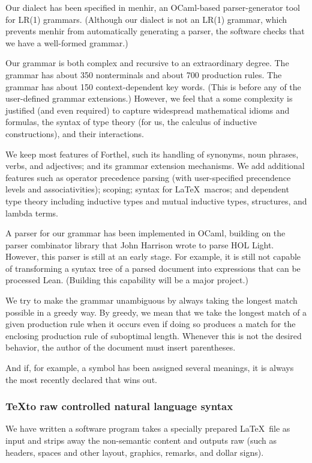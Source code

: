 \documentclass[12pt]{amsart}
\renewcommand{\~}{\ }
\renewcommand{\_}{\textunderscore}
\begin{document}
Our dialect has been specified in menhir, an OCaml-based
parser-generator tool for LR(1) grammars.  (Although our dialect is
not an LR(1) grammar, which prevents menhir from automatically
generating a parser, the software checks that we have a well-formed
grammar.)

Our grammar is both complex and recursive to an extraordinary degree.
The grammar has about 350 nonterminals and about 700 production
rules.  The grammar has about 150 context-dependent key words.  (This
is before any of the user-defined grammar extensions.)  However, we
feel that a some complexity is justified (and even required) to
capture widespread mathematical idioms and formulas, the syntax of type
theory (for us, the calculus of inductive constructions), and their
interactions.

We keep most features of Forthel, such its handling of synonyms, noun
phrases, verbs, and adjectives; and its grammar extension mechanisms.
We add additional features such as operator precedence parsing (with
user-specified precendence levels and associativities); scoping;
syntax for \LaTeX\ macros; and dependent type theory including
inductive types and mutual inductive types, structures, and lambda
terms.

A parser for our grammar has been implemented in OCaml, building on
the parser combinator library that John Harrison wrote to parse HOL
Light.  However, this parser is still at an early stage. For example,
it is still not capable of transforming a syntax tree of a parsed
document into expressions that can be processed Lean. (Building this
capability will be a major project.)

We try to make the grammar unambiguous by always taking the longest
match possible in a greedy way.  By greedy, we mean that we take
the longest match of a given production rule when it occurs 
even if doing so produces a match for the enclosing production rule 
of suboptimal length. Whenever this is not the desired behavior,
the author of the document must insert parentheses.

And if, for example, a symbol has been assigned several meanings, it
is always the most recently declared that wins out.


\subsubsection{\TeX to raw controlled natural language syntax}


We have written a software program takes a specially prepared
\LaTeX\ file as input and strips away the non-semantic content and
outputs raw (such as headers, spaces and other layout, graphics,
remarks, and dollar signs).
\end{document}
